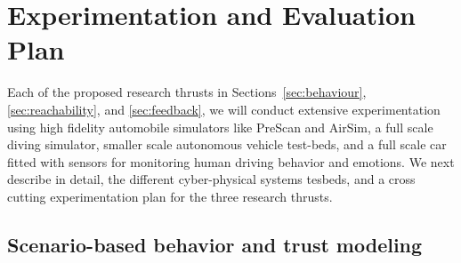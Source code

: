 
\section{Experimentation and Evaluation Plan}
\label{sec:experiment}





Each of the proposed research thrusts in Sections~\ref{sec:behaviour},\ref{sec:reachability}, and \ref{sec:feedback}, we will conduct extensive experimentation using high fidelity automobile simulators like PreScan and AirSim, a full scale diving simulator, smaller scale autonomous vehicle test-beds, and a full scale car fitted with sensors for monitoring human driving behavior and emotions. We next describe in detail, the different cyber-physical systems tesbeds, and a cross cutting experimentation plan for the three research thrusts. 


\subsection{Scenario-based behavior and trust modeling}
\label{subsec:trust-modeling}







